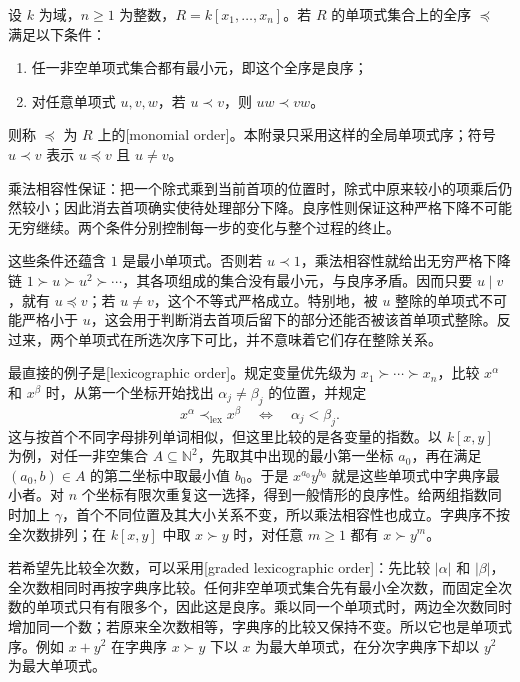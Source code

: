\begin{definition}\label{b1:def:F-monomial-order}
	设 \(k\) 为域，\(n\geq1\) 为整数，\(R=k[x_1,\ldots,x_n]\)。若 \(R\) 的单项式集合上的全序 \(\preceq\) 满足以下条件：
	\begin{enumerate}
		\item 任一非空单项式集合都有最小元，即这个全序是良序；
		\item 对任意单项式 \(u,v,w\)，若 \(u\prec v\)，则 \(uw\prec vw\)。
	\end{enumerate}
	则称 \(\preceq\) 为 \(R\) 上的[monomial order]。本附录只采用这样的全局单项式序；符号 \(u\prec v\) 表示 \(u\preceq v\) 且 \(u\ne v\)。
\end{definition}

乘法相容性保证：把一个除式乘到当前首项的位置时，除式中原来较小的项乘后仍然较小；因此消去首项确实使待处理部分下降。良序性则保证这种严格下降不可能无穷继续。两个条件分别控制每一步的变化与整个过程的终止。

\ProseParagraphBreak
这些条件还蕴含 \(1\) 是最小单项式。否则若 \(u\prec1\)，乘法相容性就给出无穷严格下降链 \(1\succ u\succ u^2\succ\cdots\)，其各项组成的集合没有最小元，与良序矛盾。因而只要 \(u\mid v\)，就有 \(u\preceq v\)；若 \(u\ne v\)，这个不等式严格成立。特别地，被 \(u\) 整除的单项式不可能严格小于 \(u\)，这会用于判断消去首项后留下的部分还能否被该首单项式整除。反过来，两个单项式在所选次序下可比，并不意味着它们存在整除关系。

\ProseParagraphBreak
最直接的例子是[lexicographic order]。规定变量优先级为 \(x_1\succ\cdots\succ x_n\)，比较 \(x^\alpha\) 和 \(x^\beta\) 时，从第一个坐标开始找出 \(\alpha_j\ne\beta_j\) 的位置，并规定
\[
	x^\alpha\prec_{\mathrm{lex}}x^\beta \quad\Longleftrightarrow\quad \alpha_j<\beta_j.
\]
这与按首个不同字母排列单词相似，但这里比较的是各变量的指数。以 \(k[x,y]\) 为例，对任一非空集合 \(A\subseteq\mathbb N^2\)，先取其中出现的最小第一坐标 \(a_0\)，再在满足 \((a_0,b)\in A\) 的第二坐标中取最小值 \(b_0\)。于是 \(x^{a_0}y^{b_0}\) 就是这些单项式中字典序最小者。对 \(n\) 个坐标有限次重复这一选择，得到一般情形的良序性。给两组指数同时加上 \(\gamma\)，首个不同位置及其大小关系不变，所以乘法相容性也成立。字典序不按全次数排列；在 \(k[x,y]\) 中取 \(x\succ y\) 时，对任意 \(m\geq1\) 都有 \(x\succ y^m\)。

\ProseParagraphBreak
若希望先比较全次数，可以采用[graded lexicographic order]：先比较 \(|\alpha|\) 和 \(|\beta|\)，全次数相同时再按字典序比较。任何非空单项式集合先有最小全次数，而固定全次数的单项式只有有限多个，因此这是良序。乘以同一个单项式时，两边全次数同时增加同一个数；若原来全次数相等，字典序的比较又保持不变。所以它也是单项式序。例如 \(x+y^2\) 在字典序 \(x\succ y\) 下以 \(x\) 为最大单项式，在分次字典序下却以 \(y^2\) 为最大单项式。

